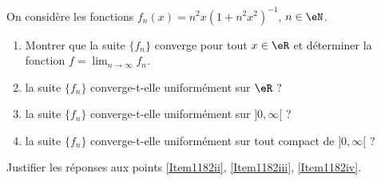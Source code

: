\begin{exercice}\label{exo1182}

On considère les fonctions $f_n(x)=n^2x(1+n^2x^2)^{-1}$, $n\in\eN$.
\begin{enumerate}
\item Montrer que la suite $\{ f_n \}$ converge pour tout $x\in\eR$ et déterminer la fonction $f=\lim_{n\to\infty}f_n$.
\item\label{Item1182ii} la suite $\{ f_n \}$ converge-t-elle uniformément sur $\eR$ ?
\item\label{Item1182iii} la suite $\{ f_n \}$ converge-t-elle uniformément sur $]0,\infty[$ ?
\item\label{Item1182iv} la suite $\{ f_n \}$ converge-t-elle uniformément sur tout compact de $]0,\infty[$ ?
\end{enumerate}
Justifier les réponses aux points \ref{Item1182ii}, \ref{Item1182iii}, \ref{Item1182iv}.

\end{exercice}


